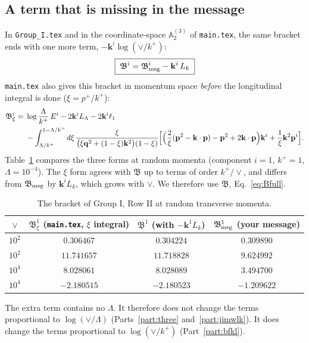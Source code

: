 \documentclass[10pt]{article}
\numberwithin{equation}{section}
\newcommand{\bk}{\mathbf k}
\newcommand{\bp}{\mathbf p}
\newcommand{\bq}{\mathbf q}
\begin{document}
\subsection{A term that is missing in the message}\label{sec:ft-missing}
In \texttt{Group\_I.tex} and in the coordinate-space $\mathbb A^{(3)}_2$ of \texttt{main.tex}, the same bracket ends with one more term, $-\bk^i\log(\vee/k^+)$:
\begin{equation}
\boxed{\;\mathfrak B^i=\mathfrak B^i_{\rm msg}-\bk^i\,L_k\;}
\label{eq:Bfull}
\end{equation}
\texttt{main.tex} also gives this bracket in momentum space \emph{before} the longitudinal integral is done ($\xi=p^+/k^+$):
\begin{align}
\mathfrak B^i_\xi={}&\log\frac{\Lambda}{k^+}\,E^i-2\bk^iL_\Lambda-2\bk^i\ell_1\notag\\
&-\int_{\Lambda/k^+}^{1-\Lambda/k^+}d\xi\,\frac{\xi}{\big(\xi\bq^2+(1-\xi)\bk^2\big)(1-\xi)}\Big[\Big(\frac2\xi(\bp^2-\bk\cdot\bp)-\bp^2+2\bk\cdot\bp\Big)\bk^i+\frac1\xi\bk^2\bp^i\Big].
\label{eq:Bxi}
\end{align}
Table~\ref{tab:xi} compares the three forms at random momenta (component $i=1$, $k^+=1$, $\Lambda=10^{-4}$). The $\xi$ form agrees with $\mathfrak B$ up to terms of order $k^+/\vee$, and differs from $\mathfrak B_{\rm msg}$ by $\bk^iL_k$, which grows with $\vee$. We therefore use $\mathfrak B$, Eq.~\eqref{eq:Bfull}.
\begin{table}[H]
\centering\small
\begin{tabular}{@{}c c c c@{}}
$\vee$ & $\mathfrak B^1_\xi$ (\texttt{main.tex}, $\xi$ integral) & $\mathfrak B^1$ (with $-\bk^1L_k$) & $\mathfrak B^1_{\rm msg}$ (your message)\\ \hline
$10^{2}$ & $0.306467$ & $0.304224$ & $0.309890$\\
$10^{2}$ & $11.741657$ & $11.718828$ & $9.624992$\\
$10^{4}$ & $8.028061$ & $8.028089$ & $3.494700$\\
$10^{4}$ & $-2.180515$ & $-2.180523$ & $-1.209622$\\
\end{tabular}
\caption{The bracket of Group I, Row II at random transverse momenta.}
\label{tab:xi}
\end{table}
The extra term contains no $\Lambda$. It therefore does not change the terms proportional to $\log(\vee/\Lambda)$ (Parts~\ref{part:three} and~\ref{part:jimwlk}). It does change the terms proportional to $\log(\vee/k^+)$ (Part~\ref{part:bfkl}).
\end{document}

